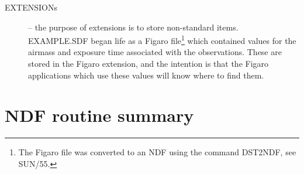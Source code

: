 \documentclass[twoside,11pt]{article}
\renewcommand{\_}{{\tt\char'137}}
\newcommand{\xref}[3]{#1}
\newcommand{\xlabel}[1]{}
\begin{document}
\begin{description}
\item[{EXTENSIONs}] -- the purpose of extensions is to store non-standard
items. EXAMPLE.SDF began life as a Figaro file\footnote{The Figaro file was
converted to an NDF using the command DST2NDF, see \xref{SUN/55}{sun55}{}.}
which contained values
for the airmass and exposure time associated with the observations.
These are stored in the Figaro extension, and the intention is that the
Figaro applications which
use these values will know where to find them.
\end{description}

\newpage
\newcommand{\japp}[2]{\item{\tt\hspace*{-5mm} #1} -- {#2}}
\section{NDF routine summary\label{apxrod}\xlabel{ndf_routine_summary}}
\end{document}
